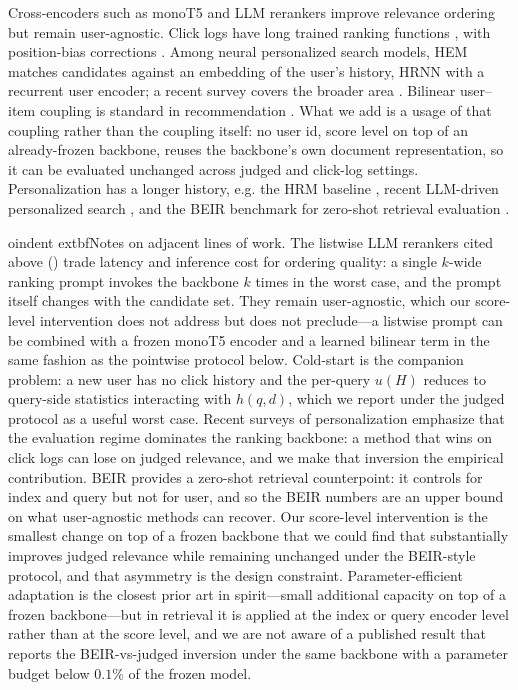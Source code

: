 \documentclass{article}
\begin{document}
Cross-encoders such as monoT5 \cite{nogueira2020monot5} and LLM rerankers
\cite{qin2023llmrerank,pradeep2023rankgpt} improve relevance ordering but
remain user-agnostic. Click logs have long trained ranking functions
\cite{craswell2007click,joachims2017unbiased}, with position-bias
corrections \cite{craswell2008experimental}. Among neural personalized
search models, HEM \cite{ai2017hem} matches candidates against an
embedding of the user's history, HRNN \cite{ge2018hrnn} with a recurrent
user encoder; a recent survey covers the broader area
\cite{shen2020personalization}. Bilinear user--item coupling is
standard in recommendation \cite{xiao2017afm,he2017nfm}.
What we add is a usage of that coupling rather than the coupling itself:
no user id, score level on top of an already-frozen backbone, reuses
the backbone's own document representation, so it can be evaluated
unchanged across judged and click-log settings. Personalization has a
longer history, e.g. the HRM baseline \cite{bennett2012hrm}, recent
LLM-driven personalized search
\cite{qin2023llmrerank,pradeep2023rankgpt}, and the BEIR benchmark
for zero-shot retrieval evaluation \cite{thakur2021beir}.



oindent	extbf{Notes on adjacent lines of work.}
The listwise LLM rerankers cited above
(\cite{qin2023llmrerank,pradeep2023rankgpt}) trade latency and
inference cost for ordering quality: a single $k$-wide ranking
prompt invokes the backbone $k$ times in the worst case, and the
prompt itself changes with the candidate set. They remain
user-agnostic, which our score-level intervention does not address
but does not preclude---a listwise prompt can be combined with a
frozen monoT5 encoder and a learned bilinear term in the same
fashion as the pointwise protocol below. Cold-start is the
companion problem: a new user has no click history and the per-query
$u(H)$ reduces to query-side statistics interacting with $h(q,d)$,
which we report under the judged protocol as a useful worst case.
Recent surveys of personalization
\cite{shen2020personalization,zamani2020personalized,lin2025personalized}
emphasize that the evaluation regime dominates the ranking
backbone: a method that wins on click logs can lose on judged
relevance, and we make that inversion the empirical contribution.
BEIR \cite{thakur2021beir} provides a zero-shot retrieval
counterpoint: it controls for index and query but not for user, and
so the BEIR numbers are an upper bound on what user-agnostic
methods can recover. Our score-level intervention is the smallest
change on top of a frozen backbone that we could find that
substantially improves judged relevance while remaining unchanged
under the BEIR-style protocol, and that asymmetry is the design
constraint. Parameter-efficient adaptation
\cite{lewis2020rag,zamani2020personalized} is the closest prior
art in spirit---small additional capacity on top of a frozen
backbone---but in retrieval it is applied at the index or query
encoder level rather than at the score level, and we are not aware
of a published result that reports the BEIR-vs-judged inversion
under the same backbone with a parameter budget below $0.1\%$ of
the frozen model.
\end{document}
